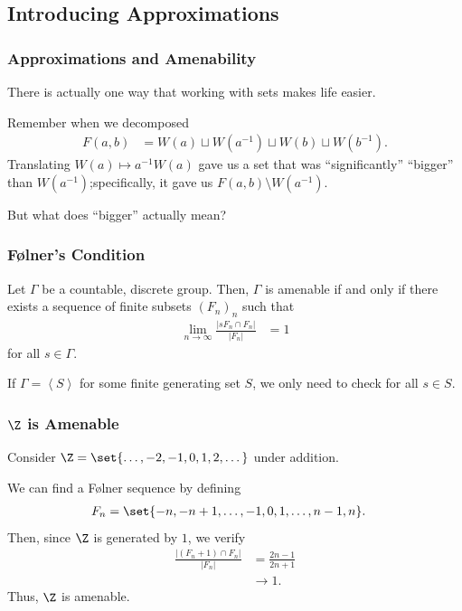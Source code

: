 \documentclass{beamer-custom}
\begin{document}
\subsection{Introducing Approximations}%
\begin{frame}
  \frametitle{Approximations and Amenability}
  There is actually one way that working with sets makes life easier.\pause\newline

  Remember when we decomposed
  \begin{align*}
    F(a,b) &= W(a) \sqcup W\left( a^{-1} \right) \sqcup W\left( b \right) \sqcup W\left( b^{-1} \right).
  \end{align*}\pause
  Translating $W\left( a \right) \mapsto a^{-1}W\left( a \right)$ gave us a set that was ``significantly'' ``bigger'' than $W\left( a^{-1} \right)$;\pause\:specifically, it gave us $F\left( a,b \right) \setminus W\left( a^{-1} \right)$.\pause\newline

  But what does ``bigger'' actually mean?
\end{frame}
\begin{frame}
  \frametitle{Følner's Condition}
  \begin{theorem}
    Let $\Gamma$ be a countable, discrete group. Then, $\Gamma$ is amenable if and only if there exists a sequence of finite subsets $\left( F_n \right)_n$ such that
    \begin{align*}
      \lim_{n\rightarrow\infty} \frac{\left\vert sF_n \cap F_n \right\vert}{\left\vert F_n \right\vert} &= 1
    \end{align*}
    for all $s\in\Gamma$.
  \end{theorem}\pause
  If $\Gamma = \left\langle S \right\rangle$ for some finite generating set $S$, we only need to check for all $s\in S$.
\end{frame}
\begin{frame}
  \frametitle{$\Z$ is Amenable}
  Consider $\Z = \set{\dots,-2,-1,0,1,2,\dots}$ under addition.\pause\newline

  We can find a Følner sequence by defining
  \begin{align*}
    F_n &= \set{-n,-n+1,\dots,-1,0,1,\dots,n-1,n}.
  \end{align*}
  Then, since $\Z$ is generated by $1$, we verify
  \begin{align*}
    \frac{\left\vert \left( F_n + 1 \right)\cap F_n \right\vert}{\left\vert F_n \right\vert} &= \frac{2n-1}{2n+1}\\
                                                                                             &\rightarrow 1.
  \end{align*}\pause
  Thus, $\Z$ is amenable.
\end{frame}
\end{document}
